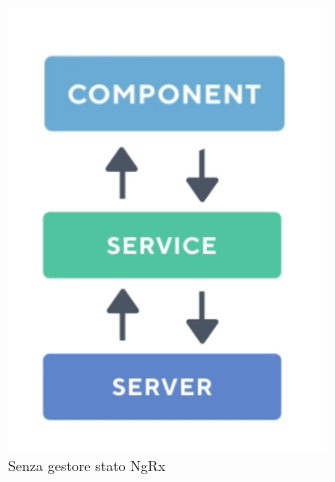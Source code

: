 \paragraph{}

\begin{figure}[h!]
    \centering  
    \caption{Senza gestore stato NgRx}
    \includegraphics[scale=0.5]{img/cap2/without-ngrx}
\end{figure}
\paragraph{}

